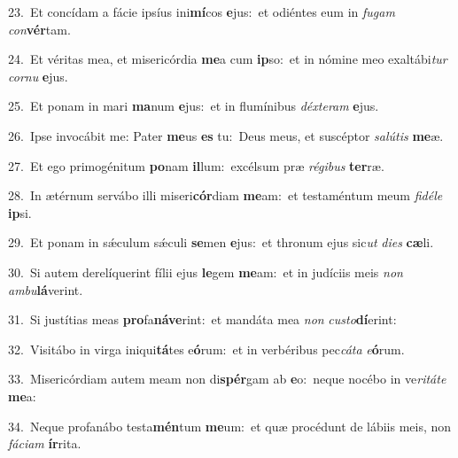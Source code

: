 {\numbfont\textcolor{\numbcolor}{23.}}~Et concídam a fácie ipsíus ini\-\textbf{mí}\-cos \textbf{e}\-jus:~\star et odiéntes eum in \textit{fu}\-\textit{gam} \textit{con}\-\textbf{vér}tam.\par
{\numbfont\textcolor{\numbcolor}{24.}}~Et véritas mea, et misericórdia \textbf{me}\-a cum \textbf{ip}\-so:~\star et in nómine meo exaltábi\textit{tur} \textit{cor}\-\textit{nu} \textbf{e}\-jus.\par
{\numbfont\textcolor{\numbcolor}{25.}}~Et ponam in mari \textbf{ma}\-num \textbf{e}\-jus:~\star et in flumínibus \textit{déx}\-\textit{te}\textit{ram} \textbf{e}\-jus.\par
{\numbfont\textcolor{\numbcolor}{26.}}~Ipse invocábit me: Pater \textbf{me}\-us \textbf{es} tu:~\star Deus meus, et suscéptor \textit{sa}\-\textit{lú}\textit{tis} \textbf{me}\-æ.\par
{\numbfont\textcolor{\numbcolor}{27.}}~Et ego primogénitum \textbf{po}\-nam \textbf{il}\-lum:~\star excélsum præ \textit{ré}\-\textit{gi}\textit{bus} \textbf{ter}\-ræ.\par
{\numbfont\textcolor{\numbcolor}{28.}}~In ætérnum servábo illi miseri\-\textbf{cór}\-diam \textbf{me}\-am:~\star et testaméntum meum \textit{fi}\-\textit{dé}\textit{le} \textbf{ip}\-si.\par
{\numbfont\textcolor{\numbcolor}{29.}}~Et ponam in sǽculum sǽculi \textbf{se}\-men \textbf{e}\-jus:~\star et thronum ejus sic\textit{ut} \textit{di}\-\textit{es} \textbf{cæ}\-li.\par
{\numbfont\textcolor{\numbcolor}{30.}}~Si autem derelíquerint fílii ejus \textbf{le}\-gem \textbf{me}\-am:~\star et in judíciis meis \textit{non} \textit{am}\-\textit{bu}\textbf{lá}verint.\par
{\numbfont\textcolor{\numbcolor}{31.}}~Si justítias meas \textbf{pro}\-fa\-\textbf{ná}\-\textbf{ve}rint:~\star et mandáta mea \textit{non} \textit{cus}\-\textit{to}\textbf{dí}erint:\par
{\numbfont\textcolor{\numbcolor}{32.}}~Visitábo in virga iniqui\-\textbf{tá}\-tes e\-\textbf{ó}\-rum:~\star et in verbéribus pec\-\textit{cá}\-\textit{ta} \textit{e}\-\textbf{ó}rum.\par
{\numbfont\textcolor{\numbcolor}{33.}}~Misericórdiam autem meam non di\-\textbf{spér}\-gam ab \textbf{e}\-o:~\star neque nocébo in ve\-\textit{ri}\-\textit{tá}\textit{te} \textbf{me}\-a:\par
{\numbfont\textcolor{\numbcolor}{34.}}~Neque profanábo testa\-\textbf{mén}\-tum \textbf{me}\-um:~\star et quæ procédunt de lábiis meis, non \textit{fá}\-\textit{ci}\textit{am} \textbf{ír}\-rita.\par
